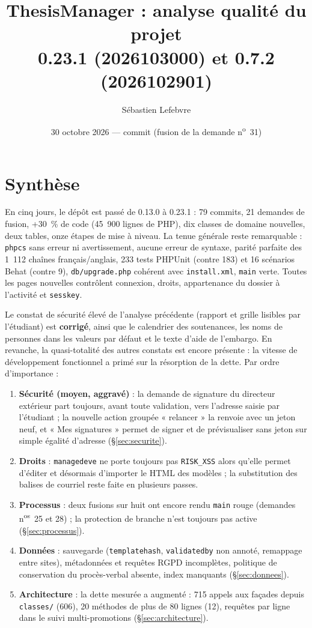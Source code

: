 \documentclass[11pt,a4paper]{article}
\title{ThesisManager : analyse qualité du projet\\
  \large \code{mod\_these} 0.23.1 (2026103000) et \code{mod\_thesesynthesis} 0.7.2 (2026102901)}
\author{Sébastien Lefebvre}
\date{30 octobre 2026 --- commit \code{5ccadce} (fusion de la demande n\textsuperscript{o}~31)}
\newcommand{\fichier}[1]{\texttt{\small #1}}
\newcommand{\code}[1]{\texttt{#1}}
\newcommand{\sev}[1]{\textbf{#1}}
\newcommand{\corrige}{\textcolor{green!45!black}{\textbf{corrigé}}}
\begin{document}
\maketitle

\section*{Synthèse}

En cinq jours, le dépôt est passé de 0.13.0 à 0.23.1 : 79 commits, 21 demandes de fusion, +30~\%
de code (45~900 lignes de PHP), dix classes de domaine nouvelles, deux tables, onze étapes de
mise à niveau. La tenue générale reste remarquable : \code{phpcs} sans erreur ni avertissement,
aucune erreur de syntaxe, parité parfaite des 1~112 chaînes français/anglais, 233 tests PHPUnit
(contre 183) et 16 scénarios Behat (contre 9), \fichier{db/upgrade.php} cohérent avec
\fichier{install.xml}, \code{main} verte. Toutes les pages nouvelles contrôlent connexion, droits,
appartenance du dossier à l'activité et \code{sesskey}.

Le constat de sécurité élevé de l'analyse précédente (rapport et grille lisibles par l'étudiant)
est \corrige, ainsi que le calendrier des soutenances, les noms de personnes dans les valeurs par
défaut et le texte d'aide de l'embargo. En revanche, la quasi-totalité des autres constats est
encore présente : la vitesse de développement fonctionnel a primé sur la résorption de la dette.
Par ordre d'importance :

\begin{enumerate}
  \item \sev{Sécurité (moyen, aggravé)} : la demande de signature du directeur extérieur part
    toujours, avant toute validation, vers l'adresse saisie par l'étudiant ; la nouvelle action
    groupée « relancer » la renvoie avec un jeton neuf, et « Mes signatures » permet de signer et
    de prévisualiser sans jeton sur simple égalité d'adresse (§\ref{sec:securite}).
  \item \sev{Droits} : \code{managedeve} ne porte toujours pas \code{RISK\_XSS} alors qu'elle
    permet d'éditer et désormais d'importer le HTML des modèles ; la substitution des balises de
    courriel reste faite en plusieurs passes.
  \item \sev{Processus} : deux fusions sur huit ont encore rendu \code{main} rouge (demandes
    n\textsuperscript{os}~25 et 28) ; la protection de branche n'est toujours pas active
    (§\ref{sec:processus}).
  \item \sev{Données} : sauvegarde (\code{templatehash}, \code{validatedby} non annoté,
    remappage entre sites), métadonnées et requêtes RGPD incomplètes, politique de conservation du
    procès-verbal absente, index manquants (§\ref{sec:donnees}).
  \item \sev{Architecture} : la dette mesurée a augmenté : 715 appels aux façades depuis
    \fichier{classes/} (606), 20 méthodes de plus de 80 lignes (12), requêtes par ligne dans le
    suivi multi-promotions (§\ref{sec:architecture}).
\end{enumerate}
\end{document}
